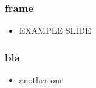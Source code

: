 \begin{frame}
\frametitle{frame}
\begin{itemize}
  \item EXAMPLE SLIDE
\end{itemize}
\end{frame}



\begin{frame}

\frametitle{bla}
\begin{itemize}
  \item another one
\end{itemize}
\end{frame}

